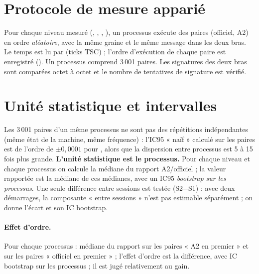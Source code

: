 \section{Protocole de mesure apparié}
Pour chaque niveau mesuré (, , , ), un processus exécute des paires (officiel, A2) en ordre \emph{aléatoire}, avec la même graine et le même message dans les deux bras. Le temps est lu par  (ticks TSC) ; l'ordre d'exécution de chaque paire est enregistré (). Un processus comprend 3\,001 paires. Les signatures des deux bras sont comparées octet à octet et le nombre de tentatives de signature est vérifié.

\section{Unité statistique et intervalles}
Les 3\,001 paires d'un même processus ne sont pas des répétitions indépendantes (même état de la machine, même fréquence) : l'IC95 « naïf » calculé sur les paires est de l'ordre de $\pm0{,}0001$ pour , alors que la dispersion entre processus est 5 à 15 fois plus grande. \textbf{L'unité statistique est le processus.} Pour chaque niveau et chaque processus on calcule la médiane du rapport A2/officiel ; la valeur rapportée est la médiane de ces médianes, avec un IC95 \emph{bootstrap sur les processus}. Une seule différence entre sessions est testée (S2$-$S1) : avec deux démarrages, la composante « entre sessions » n'est pas estimable séparément ; on donne l'écart et son IC bootstrap.

\paragraph{Effet d'ordre.} Pour chaque processus : médiane du rapport sur les paires « A2 en premier » et sur les paires « officiel en premier » ; l'effet d'ordre est la différence, avec IC bootstrap sur les processus ; il est jugé relativement au gain.

